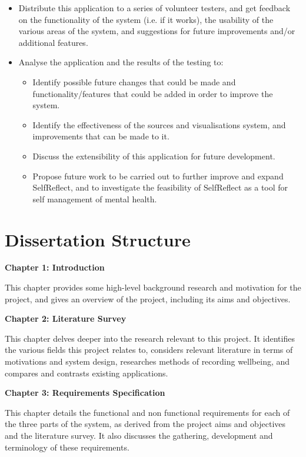 \documentclass[11pt,openright,a4paper]{report}
\begin{document}
\begin{itemize}
\item Distribute this application to a series of volunteer testers, and get feedback on the functionality of the system (i.e. if it works), the usability of the various areas of the system, and suggestions for future improvements and/or additional features.
\item Analyse the application and the results of the testing to:
\begin{itemize}
  \item Identify possible future changes that could be made and functionality/features that could be added in order to improve the system.
  \item Identify the effectiveness of the sources and visualisations system, and improvements that can be made to it.
  \item Discuss the extensibility of this application for future development.
  \item Propose future work to be carried out to further improve and expand SelfReflect, and to investigate the feasibility of SelfReflect as a tool for self management of mental health.
\end{itemize}

\end{itemize}

\section{Dissertation Structure}
\textbf{Chapter 1: Introduction}

This chapter provides some high-level background research and motivation for the project, and gives an overview of the project, including its aims and objectives.

\textbf{Chapter 2: Literature Survey}

This chapter delves deeper into the research relevant to this project. It identifies the various fields this project relates to, considers relevant literature in terms of motivations and system design, researches methods of recording wellbeing, and compares and contrasts existing applications.

\textbf{Chapter 3: Requirements Specification}

This chapter details the functional and non functional requirements for each of the three parts of the system, as derived from the project aims and objectives and the literature survey. It also discusses the gathering, development and terminology of these requirements.
\end{document}
